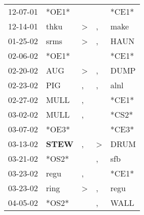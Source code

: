 \begin{supertabular}{p{0.07\textwidth}p{0.06\textwidth}p{0.02\textwidth}p{0.02\textwidth}p{0.06\textwidth}}
          12-07-01\textsuperscript{} &                            *OE1* &                  &                  &                            *CE1* \\
          12-14-01\textsuperscript{} &           thku\textsuperscript{} &     \textgreater &                , &           make\textsuperscript{} \\
          01-25-02\textsuperscript{} &           srms\textsuperscript{} &     \textgreater &                , &           HAUN\textsuperscript{} \\
          02-06-02\textsuperscript{} &                            *OE1* &                  &                  &                            *CE1* \\
          02-20-02\textsuperscript{} &            AUG\textsuperscript{} &     \textgreater &                , &           DUMP\textsuperscript{} \\
          02-23-02\textsuperscript{} &            PIG\textsuperscript{} &                , &                , &           alnl\textsuperscript{} \\
          02-27-02\textsuperscript{} &           MULL\textsuperscript{} &                , &                  &                            *CE1* \\
          03-02-02\textsuperscript{} &           MULL\textsuperscript{} &                , &                  &                            *CS2* \\
          03-07-02\textsuperscript{} &                            *OE3* &                  &                  &                            *CE3* \\
          03-13-02\textsuperscript{} &  \textbf{STEW\textsuperscript{}} &                , &     \textgreater &           DRUM\textsuperscript{} \\
          03-21-02\textsuperscript{} &                            *OS2* &                  &                , &            sfb\textsuperscript{} \\
          03-23-02\textsuperscript{} &           regu\textsuperscript{} &                , &                  &                            *CE1* \\
          03-23-02\textsuperscript{} &           ring\textsuperscript{} &     \textgreater &                , &           regu\textsuperscript{} \\
          04-05-02\textsuperscript{} &                            *OS2* &                  &                , &           WALL\textsuperscript{} \\

\end{supertabular}
